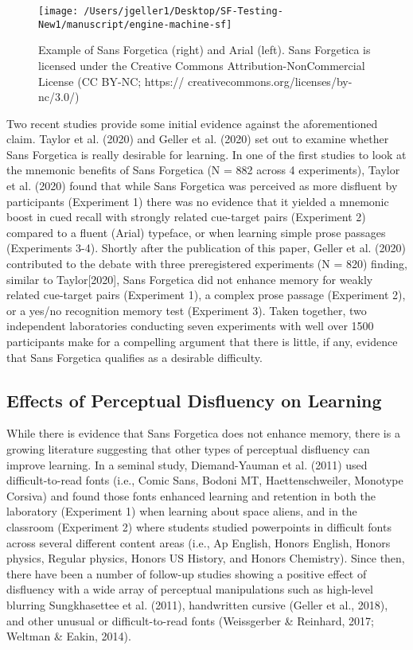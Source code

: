 \documentclass[
  english,
  jou]{apa7}
\begin{document}
\begin{figure}

{\centering \texttt{[image: /Users/jgeller1/Desktop/SF-Testing-New1/manuscript/engine-machine-sf]} 

}

\caption{Example of Sans Forgetica (right) and Arial (left). Sans Forgetica is licensed under the Creative Commons Attribution-NonCommercial License (CC BY-NC; https:// creativecommons.org/licenses/by-nc/3.0/)}\label{fig:unnamed-chunk-1}
\end{figure}

Two recent studies provide some initial evidence against the aforementioned claim. Taylor et al. (2020) and Geller et al. (2020) set out to examine whether Sans Forgetica is really desirable for learning. In one of the first studies to look at the mnemonic benefits of Sans Forgetica (N = 882 across 4 experiments), Taylor et al. (2020) found that while Sans Forgetica was perceived as more disfluent by participants (Experiment 1) there was no evidence that it yielded a mnemonic boost in cued recall with strongly related cue-target pairs (Experiment 2) compared to a fluent (Arial) typeface, or when learning simple prose passages (Experiments 3-4). Shortly after the publication of this paper, Geller et al. (2020) contributed to the debate with three preregistered experiments (N = 820) finding, similar to Taylor{[}2020{]}, Sans Forgetica did not enhance memory for weakly related cue-target pairs (Experiment 1), a complex prose passage (Experiment 2), or a yes/no recognition memory test (Experiment 3). Taken together, two independent laboratories conducting seven experiments with well over 1500 participants make for a compelling argument that there is little, if any, evidence that Sans Forgetica qualifies as a desirable difficulty.

\hypertarget{effects-of-perceptual-disfluency-on-learning}{%
\subsection{Effects of Perceptual Disfluency on Learning}\label{effects-of-perceptual-disfluency-on-learning}}

While there is evidence that Sans Forgetica does not enhance memory, there is a growing literature suggesting that other types of perceptual disfluency can improve learning. In a seminal study, Diemand-Yauman et al. (2011) used difficult-to-read fonts (i.e., Comic Sans, Bodoni MT, Haettenschweiler, Monotype Corsiva) and found those fonts enhanced learning and retention in both the laboratory (Experiment 1) when learning about space aliens, and in the classroom (Experiment 2) where students studied powerpoints in difficult fonts across several different content areas (i.e., Ap English, Honors English, Honors physics, Regular physics, Honors US History, and Honors Chemistry). Since then, there have been a number of follow-up studies showing a positive effect of disfluency with a wide array of perceptual manipulations such as high-level blurring Sungkhasettee et al. (2011), handwritten cursive (Geller et al., 2018), and other unusual or difficult-to-read fonts (Weissgerber \& Reinhard, 2017; Weltman \& Eakin, 2014).
\end{document}
